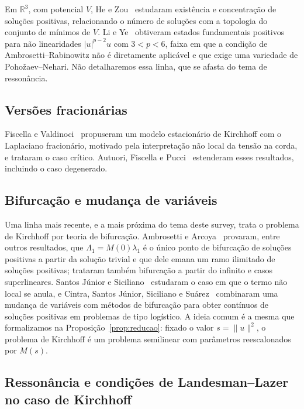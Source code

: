 \documentclass[11pt,a4paper]{article}
\theoremstyle{plain}
\theoremstyle{definition}
\theoremstyle{remark}
\newcommand{\R}{\mathbb{R}}
\newcommand{\norm}[1]{\lVert #1\rVert}
\newcommand{\abs}[1]{\lvert #1\rvert}
\begin{document}
Em $\R^3$, com potencial $V$, He e Zou~\cite{HeZou2012} estudaram existência e
concentração de soluções positivas, relacionando o número de soluções com a
topologia do conjunto de mínimos de $V$. Li e Ye~\cite{LiYe2014} obtiveram
estados fundamentais positivos para não linearidades $\abs{u}^{p-2}u$ com
$3<p<6$, faixa em que a condição de Ambrosetti--Rabinowitz não é diretamente
aplicável e que exige uma variedade de Pohožaev--Nehari. Não detalharemos essa
linha, que se afasta do tema de ressonância.

\subsection{Versões fracionárias}

Fiscella e Valdinoci~\cite{FiscellaValdinoci2014} propuseram um modelo
estacionário de Kirchhoff com o Laplaciano fracionário, motivado pela
interpretação não local da tensão na corda, e trataram o caso crítico.
Autuori, Fiscella e Pucci~\cite{AutuoriFiscellaPucci2015} estenderam esses
resultados, incluindo o caso degenerado.

\subsection{Bifurcação e mudança de variáveis}

Uma linha mais recente, e a mais próxima do tema deste survey, trata o
problema de Kirchhoff por teoria de bifurcação. Ambrosetti e
Arcoya~\cite{AmbrosettiArcoya2017} provaram, entre outros resultados, que
$\Lambda_1=M(0)\lambda_1$ é o único ponto de bifurcação de soluções positivas a
partir da solução trivial e que dele emana um ramo ilimitado de soluções
positivas; trataram também bifurcação a partir do infinito e casos
superlineares. Santos Júnior e Siciliano~\cite{SantosJuniorSiciliano2018}
estudaram o caso em que o termo não local se anula, e Cintra, Santos Júnior,
Siciliano e Suárez~\cite{CintraEtAl2020} combinaram uma mudança de variáveis com
métodos de bifurcação para obter contínuos de soluções positivas em problemas
de tipo logístico. A ideia comum é a mesma que formalizamos na
Proposição~\ref{prop:reducao}: fixado o valor $s=\norm{u}^2$, o problema de
Kirchhoff é um problema semilinear com parâmetros reescalonados por $M(s)$.

\subsection{Ressonância e condições de Landesman--Lazer no caso de Kirchhoff}
\end{document}
